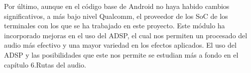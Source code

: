 Por último, aunque en el código base de Android no haya habido cambios significativos, a más bajo nivel Qualcomm, el proveedor de los \gls{SoC} de los terminales con los que se ha trabajado en este proyecto. Este módulo ha incorporado mejoras en el uso del \gls{ADSP}, el cual nos permiten un procesado del audio más efectivo y una mayor variedad en los efectos aplicados. El uso del \gls{ADSP} y las posibilidades que este nos permite se estudian más a fondo en el capítulo 6.Rutas del audio. %